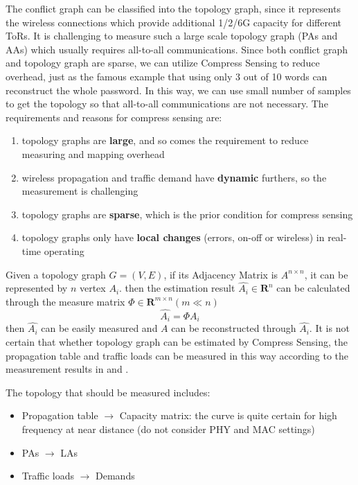 \documentclass[journal,onecolumn,11pt]{IEEEtran}
\begin{document}
The conflict graph can be classified into the topology graph, since it represents the wireless connections which provide additional 1/2/6G capacity for different ToRs. It is challenging to measure such a large scale topology graph (PAs and AAs) which usually requires all-to-all communications. Since both conflict graph \cite{Halperin:2011:ADC:2018436.2018442} and topology graph \cite{Chen:2010:GAA:1851182.1851190} are sparse, we can utilize Compress Sensing to reduce overhead, just as the famous example that using only 3 out of 10 words can reconstruct the whole password. In this way, we can use small number of samples to get the topology so that all-to-all communications are not necessary. The requirements and reasons for compress sensing are:
\begin{enumerate}
  \item topology graphs are \textbf{large}, and so comes the requirement to reduce measuring and mapping overhead
  \item wireless propagation and traffic demand have \textbf{dynamic} furthers, so the measurement is challenging
  \item topology graphs are \textbf{sparse}, which is the prior condition for compress sensing
  \item topology graphs only have \textbf{local changes} (errors, on-off or wireless) in real-time operating
\end{enumerate}

Given a topology graph $G=(V,E)$, if its Adjacency Matrix is $A^{n\times n}$, it can be represented by $n$ vertex $A_i$. then the estimation result $\hat{A_i}\in \textbf{R}^n$ can be calculated through the measure matrix $\Phi\in \textbf{R}^{m\times n} (m\ll n)$
\begin{equation}
 \hat{A_i}=\Phi A_i
 \label{estimation}
\end{equation}
then $\hat{A_i}$ can be easily measured and $A$ can be reconstructed through $\hat{A_i}$. It is not certain that whether topology graph can be estimated by Compress Sensing, the propagation table and traffic loads can be measured in this way according to the measurement results in \cite{Halperin:2011:ADC:2018436.2018442} and \cite{Greenberg:2009:VSF:1592568.1592576}.

The topology that should be measured includes:
\begin{itemize}
  \item Propagation table $\rightarrow$ Capacity matrix: the curve is quite certain for high frequency at near distance (do not consider PHY and MAC settings)
  \item PAs $\rightarrow$ LAs
  \item Traffic loads $\rightarrow$ Demands
\end{itemize}
\end{document}
